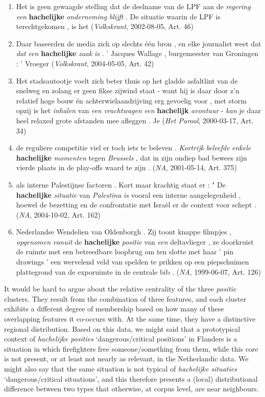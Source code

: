 \documentclass[
]{book}
\begin{document}
\begin{enumerate}
\def\labelenumi{(\arabic{enumi})}
\setcounter{enumi}{18}
\item
  Het is geen gewaagde stelling dat de deelname van de LPF aan de \emph{regering} \emph{een} \textbf{hachelijke} \emph{onderneming} \emph{blijft} . De situatie waarin de LPF is terechtgekomen , is het (\emph{Volkskrant}, 2002-08-05, Art. 46)
\item
  Daar baseerden de media zich op slechts één bron , en elke journalist weet dat \emph{dat} \emph{een} \textbf{hachelijke} \emph{zaak} \emph{is} . ' Jacques Wallage , burgemeester van Groningen : ' Vroeger (\emph{Volkskrant}, 2004-05-05, Art. 42)
\item
  Het stadsautootje voelt zich beter thuis op het gladde asfaltlint van de snelweg en zolang er geen fikse zijwind staat - want hij is daar door z'n relatief hoge bouw én achterwielaandrijving erg gevoelig voor , met storm opzij is het \emph{inhalen} van \emph{een} \emph{vrachtwagen} \emph{een} \textbf{hachelijk} \emph{avontuur} - \emph{kan} je daar heel relaxed grote afstanden mee afleggen . Je (\emph{Het Parool}, 2000-03-17, Art. 34)
\item
  de reguliere competitie viel er toch iets te beleven . \emph{Kortrijk} \emph{beleefde} \emph{enkele} \textbf{hachelijke} \emph{momenten} tegen \emph{Brussels} , dat in zijn ondiep bad bewees zijn vierde plaats in de play-offs waard te zijn . (\emph{NA}, 2001-05-14, Art. 375)
\item
  als interne Palestijnse factoren . Kort maar krachtig staat er : " De \textbf{hachelijke} \emph{situatie} van \emph{Palestina} \emph{is} vooral een interne aangelegenheid , hoewel de bezetting en de confrontatie met Israël er de context voor schept . (\emph{NA}, 2004-10-02, Art. 162)
\item
  Nederlandse Wendelien van Oldenborgh . Zij toont knappe filmpjes , \emph{opgenomen} \emph{vanuit} de \textbf{hachelijke} \emph{positie} van \emph{een} deltavlieger , ze doorkruist de ruimte met een betreedbare loopbrug om ten slotte met haar ' pin drawings ' een wervelend veld van spelden te prikken op een piepschuimen plattegrond van de exporuimte in de centrale bib . (\emph{NA}, 1999-06-07, Art. 126)
\end{enumerate}

It would be hard to argue about the relative centrality of the three \emph{positie} clusters. They result from the combination of three features, and each cluster exhibits a different degree of membership based on how many of these overlapping features it co-occurs with. At the same time, they have a distinctive regional distribution. Based on this data, we might said that a prototypical context of \emph{hachelijke posities} `dangerous/critical positions' in Flanders is a situation in which firefighters free someone/something from them, while this core is not present, or at least not nearly as relevant, in the Netherlandic data. We might also say that the same situation is not typical of \emph{hachelijke situaties} `dangerous/critical situations', and this therefore presents a (local) distributional difference between two types that otherwise, at corpus level, are near neighbours.
\end{document}
